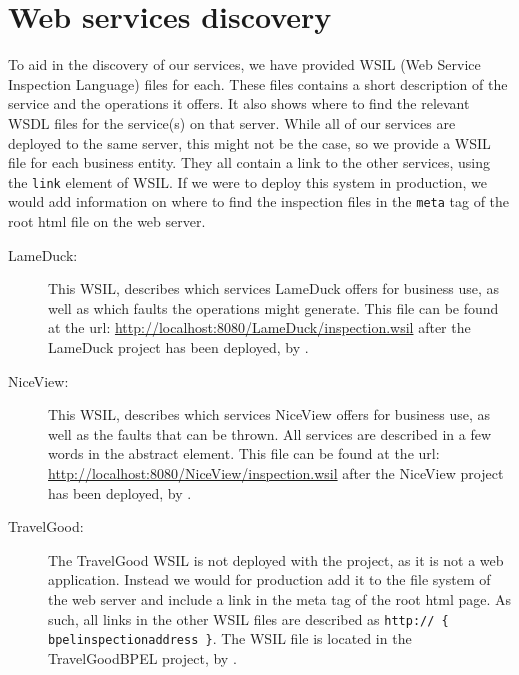 \chapter{Web services discovery}
\mrb

\noindent
To aid in the discovery of our services, we have provided WSIL (Web Service Inspection Language) files for each. These files contains a short description of the service and the operations it offers. It also shows where to find the relevant WSDL files for the service(s) on that server. While all of our services are deployed to the same server, this might not be the case, so we provide a WSIL file for each business entity. They all contain a link to the other services, using the \texttt{link} element of WSIL. If we were to deploy this system in production, we would add information on where to find the inspection files in the \texttt{meta} tag of the root html file on the web server.

\begin{description}
\item [LameDuck:] This WSIL, describes which services LameDuck offers for business use, as well as which faults the operations might generate. This file can be found at the url: \url{http://localhost:8080/LameDuck/inspection.wsil} after the LameDuck project has been deployed, by \kim{}.

\item [NiceView:] This WSIL, describes which services NiceView offers for business use, as well as the faults that can be thrown. All services are described in a few words in the abstract element. This file can be found at the url: \url{http://localhost:8080/NiceView/inspection.wsil} after the NiceView project has been deployed, by \mkt{}.

\item [TravelGood:] The TravelGood WSIL is not deployed with the project, as it is not a web application. Instead we would for production add it to the file system of the web server and include a link in the meta tag of the root html page. As such, all links in the other WSIL files are described as \texttt{http:// \{ bpelinspectionaddress \}}. The WSIL file is located in the TravelGoodBPEL project, by \pet{}.


\end{description}
